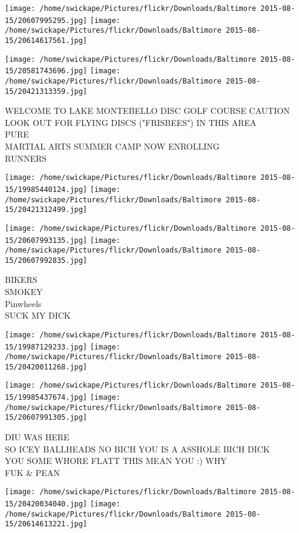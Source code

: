 \documentclass[10pt,letterpaper]{article}
\begin{document}
\texttt{[image: /home/swickape/Pictures/flickr/Downloads/Baltimore 2015-08-15/20607995295.jpg]}
\texttt{[image: /home/swickape/Pictures/flickr/Downloads/Baltimore 2015-08-15/20614617561.jpg]}

\texttt{[image: /home/swickape/Pictures/flickr/Downloads/Baltimore 2015-08-15/20581743696.jpg]}
\texttt{[image: /home/swickape/Pictures/flickr/Downloads/Baltimore 2015-08-15/20421313359.jpg]}

WELCOME TO LAKE MONTEBELLO DISC GOLF COURSE CAUTION LOOK OUT FOR FLYING DISCS ("FRISBEES") IN THIS AREA\\
PURE\\
MARTIAL ARTS SUMMER CAMP NOW ENROLLING\\
RUNNERS
\pagebreak

\texttt{[image: /home/swickape/Pictures/flickr/Downloads/Baltimore 2015-08-15/19985440124.jpg]}
\texttt{[image: /home/swickape/Pictures/flickr/Downloads/Baltimore 2015-08-15/20421312499.jpg]}

\texttt{[image: /home/swickape/Pictures/flickr/Downloads/Baltimore 2015-08-15/20607993135.jpg]}
\texttt{[image: /home/swickape/Pictures/flickr/Downloads/Baltimore 2015-08-15/20607992835.jpg]}

BIKERS\\
SMOKEY\\
Pinwheels\\
SUCK MY DICK
\pagebreak

\texttt{[image: /home/swickape/Pictures/flickr/Downloads/Baltimore 2015-08-15/19987129233.jpg]}
\texttt{[image: /home/swickape/Pictures/flickr/Downloads/Baltimore 2015-08-15/20420011268.jpg]}

\texttt{[image: /home/swickape/Pictures/flickr/Downloads/Baltimore 2015-08-15/19985437674.jpg]}
\texttt{[image: /home/swickape/Pictures/flickr/Downloads/Baltimore 2015-08-15/20607991305.jpg]}

DIU WAS HERE\\
SO ICEY BALLHEADS NO BICH YOU IS A ASSHOLE BICH DICK\\
YOU SOME WHORE FLATT THIS MEAN YOU :) WHY\\
FUK \& PEAN
\pagebreak

\texttt{[image: /home/swickape/Pictures/flickr/Downloads/Baltimore 2015-08-15/20420034040.jpg]}
\texttt{[image: /home/swickape/Pictures/flickr/Downloads/Baltimore 2015-08-15/20614613221.jpg]}
\end{document}
